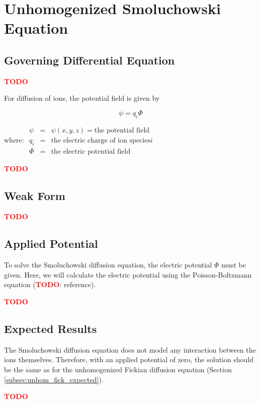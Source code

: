 
\section{Unhomogenized Smoluchowski Equation}\label{sec:unhom_smol}

\subsection{Governing Differential Equation}\label{subsec:unhom_smol_gov}

\textcolor{red}{\textbf{TODO}}

For diffusion of ions, the potential field is given by

\begin{equation}
\psi=q_i \Phi
\end{equation}

where:
$\begin{array}{rcl}
\psi & = & \psi(x,y,z) = \text{the potential field} \\
q_i & = & \text{the electric charge of ion species} i\\
\Phi & = & \text{the electric potential field}
\end{array}$

\textcolor{red}{\textbf{TODO}}

\subsection{Weak Form}\label{subsec:unhom_smol_weak}

\textcolor{red}{\textbf{TODO}}

\subsection{Applied Potential}\label{subsec:unhom_smol_potential}

To solve the Smoluchowski diffusion equation, the electric potential $\Phi$ must be given.
Here, we will calculate the electric potential using the Poisson-Boltzmann equation
(\textcolor{red}{\textbf{TODO}}: reference).

\textcolor{red}{\textbf{TODO}}

\subsection{Expected Results}\label{subsec:unhom_smol_expected}

The Smoluchowski diffusion equation does not model any interaction between the ions themselves.
Therefore, with an applied potential of zero,
the solution should be the same as for the
unhomogenized Fickian diffusion equation (Section \ref{subsec:unhom_fick_expected}).

\textcolor{red}{\textbf{TODO}}


